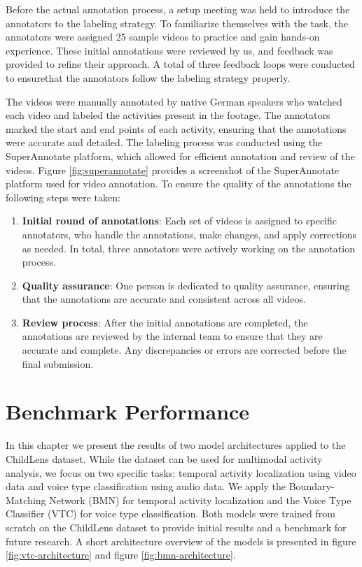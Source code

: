 \documentclass[
  man,floatsintext]{apa6}
\providecommand{\tightlist}{%
  \setlength{\itemsep}{0pt}\setlength{\parskip}{0pt}}
\begin{document}
Before the actual annotation process, a setup meeting was held to introduce the annotators to the labeling strategy. To familiarize themselves with the task, the annotators were assigned 25 sample videos to practice and gain hands-on experience. These initial annotations were reviewed by us, and feedback was provided to refine their approach. A total of three feedback loops were conducted to ensurethat the annotators follow the labeling strategy properly.

The videos were manually annotated by native German speakers who watched each video and labeled the activities present in the footage. The annotators marked the start and end points of each activity, ensuring that the annotations were accurate and detailed. The labeling process was conducted using the SuperAnnotate platform, which allowed for efficient annotation and review of the videos. Figure \ref{fig:superannotate} provides a screenshot of the SuperAnnotate platform used for video annotation. To ensure the quality of the annotations the following steps were taken:

\begin{enumerate}
\def\labelenumi{\arabic{enumi}.}
\tightlist
\item
  \textbf{Initial round of annotations}: Each set of videos is assigned to specific annotators, who handle the annotations, make changes, and apply corrections as needed. In total, three annotators were actively working on the annotation process.
\item
  \textbf{Quality assurance}: One person is dedicated to quality assurance, ensuring that the annotations are accurate and consistent across all videos.
\item
  \textbf{Review process}: After the initial annotations are completed, the annotations are reviewed by the internal team to ensure that they are accurate and complete. Any discrepancies or errors are corrected before the final submission.
\end{enumerate}

\section{Benchmark Performance}\label{benchmark-performance}

In this chapter we present the results of two model architectures applied to the ChildLens dataset. While the dataset can be used for multimodal activity analysis, we focus on two specific tasks: temporal activity localization using video data and voice type classification using audio data. We apply the Boundary-Matching Network (BMN) for temporal activity localization and the Voice Type Classifier (VTC) for voice type classification. Both models were trained from scratch on the ChildLens dataset to provide initial results and a benchmark for future research. A short architecture overview of the models is presented in figure \ref{fig:vtc-architecture} and figure \ref{fig:bmn-architecture}.
\end{document}
